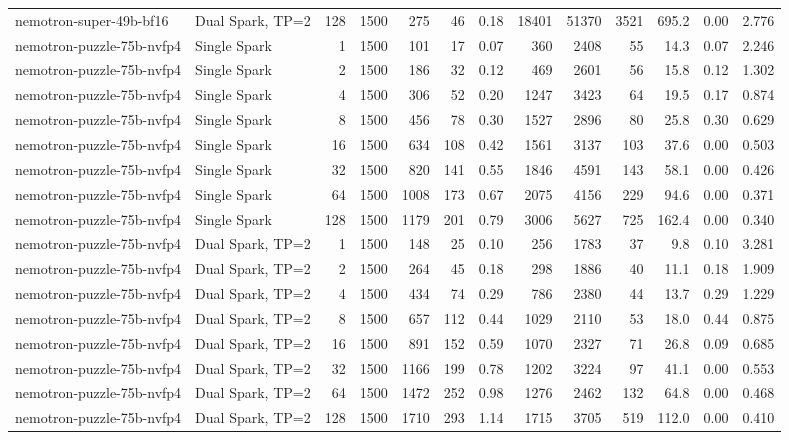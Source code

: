 \begin{tabular}{l l r r r r r r r r r r r}
nemotron-super-49b-bf16 & Dual Spark, TP=2 & 128 & 1500 & 275 & 46 & 0.18 & 18401 & 51370 & 3521 & 695.2 & 0.00 & 2.776 \\
\addlinespace
nemotron-puzzle-75b-nvfp4 & Single Spark & 1 & 1500 & 101 & 17 & 0.07 & 360 & 2408 & 55 & 14.3 & 0.07 & 2.246 \\
nemotron-puzzle-75b-nvfp4 & Single Spark & 2 & 1500 & 186 & 32 & 0.12 & 469 & 2601 & 56 & 15.8 & 0.12 & 1.302 \\
nemotron-puzzle-75b-nvfp4 & Single Spark & 4 & 1500 & 306 & 52 & 0.20 & 1247 & 3423 & 64 & 19.5 & 0.17 & 0.874 \\
nemotron-puzzle-75b-nvfp4 & Single Spark & 8 & 1500 & 456 & 78 & 0.30 & 1527 & 2896 & 80 & 25.8 & 0.30 & 0.629 \\
nemotron-puzzle-75b-nvfp4 & Single Spark & 16 & 1500 & 634 & 108 & 0.42 & 1561 & 3137 & 103 & 37.6 & 0.00 & 0.503 \\
nemotron-puzzle-75b-nvfp4 & Single Spark & 32 & 1500 & 820 & 141 & 0.55 & 1846 & 4591 & 143 & 58.1 & 0.00 & 0.426 \\
nemotron-puzzle-75b-nvfp4 & Single Spark & 64 & 1500 & 1008 & 173 & 0.67 & 2075 & 4156 & 229 & 94.6 & 0.00 & 0.371 \\
nemotron-puzzle-75b-nvfp4 & Single Spark & 128 & 1500 & 1179 & 201 & 0.79 & 3006 & 5627 & 725 & 162.4 & 0.00 & 0.340 \\
\addlinespace
nemotron-puzzle-75b-nvfp4 & Dual Spark, TP=2 & 1 & 1500 & 148 & 25 & 0.10 & 256 & 1783 & 37 & 9.8 & 0.10 & 3.281 \\
nemotron-puzzle-75b-nvfp4 & Dual Spark, TP=2 & 2 & 1500 & 264 & 45 & 0.18 & 298 & 1886 & 40 & 11.1 & 0.18 & 1.909 \\
nemotron-puzzle-75b-nvfp4 & Dual Spark, TP=2 & 4 & 1500 & 434 & 74 & 0.29 & 786 & 2380 & 44 & 13.7 & 0.29 & 1.229 \\
nemotron-puzzle-75b-nvfp4 & Dual Spark, TP=2 & 8 & 1500 & 657 & 112 & 0.44 & 1029 & 2110 & 53 & 18.0 & 0.44 & 0.875 \\
nemotron-puzzle-75b-nvfp4 & Dual Spark, TP=2 & 16 & 1500 & 891 & 152 & 0.59 & 1070 & 2327 & 71 & 26.8 & 0.09 & 0.685 \\
nemotron-puzzle-75b-nvfp4 & Dual Spark, TP=2 & 32 & 1500 & 1166 & 199 & 0.78 & 1202 & 3224 & 97 & 41.1 & 0.00 & 0.553 \\
nemotron-puzzle-75b-nvfp4 & Dual Spark, TP=2 & 64 & 1500 & 1472 & 252 & 0.98 & 1276 & 2462 & 132 & 64.8 & 0.00 & 0.468 \\
nemotron-puzzle-75b-nvfp4 & Dual Spark, TP=2 & 128 & 1500 & 1710 & 293 & 1.14 & 1715 & 3705 & 519 & 112.0 & 0.00 & 0.410 \\

\end{tabular}
